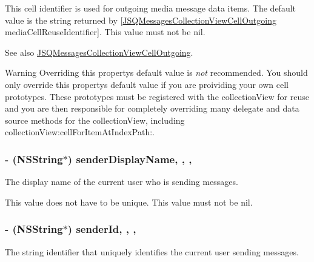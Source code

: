 This cell identifier is used for outgoing media message data items. The default value is the string returned by {\ttfamily \mbox{[}\hyperlink{interface_j_s_q_messages_collection_view_cell_outgoing}{J\+S\+Q\+Messages\+Collection\+View\+Cell\+Outgoing} media\+Cell\+Reuse\+Identifier\mbox{]}}. This value must not be {\ttfamily nil}.

\begin{DoxySeeAlso}{See also}
\hyperlink{interface_j_s_q_messages_collection_view_cell_outgoing}{J\+S\+Q\+Messages\+Collection\+View\+Cell\+Outgoing}.
\end{DoxySeeAlso}
\begin{DoxyWarning}{Warning}
Overriding this property\textquotesingle{}s default value is {\itshape not} recommended. You should only override this property\textquotesingle{}s default value if you are proividing your own cell prototypes. These prototypes must be registered with the collection\+View for reuse and you are then responsible for completely overriding many delegate and data source methods for the collection\+View, including {\ttfamily collection\+View\+:cell\+For\+Item\+At\+Index\+Path\+:}. 
\end{DoxyWarning}
\hypertarget{interface_j_s_q_messages_view_controller_ad034890061c8c276862b34e09252bae8}{}
\subsubsection[{sender\+Display\+Name}]{\setlength{\rightskip}{0pt plus 5cm}-\/ (N\+S\+String$\ast$) sender\+Display\+Name\hspace{0.3cm}{\ttfamily [read]}, {\ttfamily [write]}, {\ttfamily [nonatomic]}, {\ttfamily [copy]}}\label{interface_j_s_q_messages_view_controller_ad034890061c8c276862b34e09252bae8}
The display name of the current user who is sending messages.

This value does not have to be unique. This value must not be {\ttfamily nil}. \hypertarget{interface_j_s_q_messages_view_controller_afd474f0e4f7923e29a98484090cbdc45}{}
\subsubsection[{sender\+Id}]{\setlength{\rightskip}{0pt plus 5cm}-\/ (N\+S\+String$\ast$) sender\+Id\hspace{0.3cm}{\ttfamily [read]}, {\ttfamily [write]}, {\ttfamily [nonatomic]}, {\ttfamily [copy]}}\label{interface_j_s_q_messages_view_controller_afd474f0e4f7923e29a98484090cbdc45}
The string identifier that uniquely identifies the current user sending messages.

